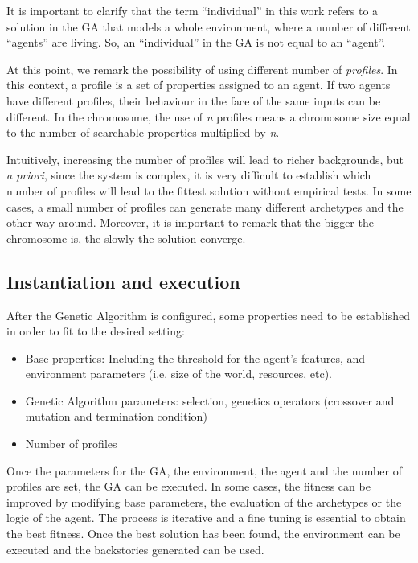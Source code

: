 \documentclass[letterpaper]{article}
\begin{document}
It is important to clarify that the term ``individual'' in this work refers to a solution in the GA that models a whole environment, where a number of different ``agents'' are living. So, an ``individual'' in the GA is not equal to an ``agent''.  


At this point, we remark the possibility of using different number of {\em profiles}. In this context, a profile is a set of properties assigned to an agent. If two agents have different profiles, their behaviour in the face of the same inputs can be different. In the chromosome, the use of \textit{n} profiles means a chromosome size equal to the number of searchable properties multiplied by \textit{n}.

Intuitively, increasing the number of profiles will lead to richer backgrounds, but \textit{a priori}, since the system is complex, it is very difficult to establish which number of profiles will lead to the fittest solution without empirical tests. In some cases, a small number of profiles can generate many different archetypes and the other way around. Moreover, it is important to remark that the bigger the chromosome is, the slowly the solution converge.


\subsection{Instantiation and execution}

After the Genetic Algorithm is configured, some properties need to be established in order to fit to the desired setting:
\begin{itemize}
\item Base properties: Including the threshold for the agent's features, and environment parameters (i.e. size of the world, resources, etc).
\item Genetic Algorithm parameters: selection, genetics operators (crossover and mutation and termination condition)
\item Number of profiles
\end{itemize}

Once the parameters for the GA, the environment, the agent and the number of profiles are set, the GA can be executed. In some cases, the fitness can be improved by modifying base parameters, the evaluation of the archetypes or the logic of the agent. The process is iterative and a fine tuning is essential to obtain the best fitness. Once the best solution has been found, the environment can be executed and the backstories generated can be used.
\end{document}
